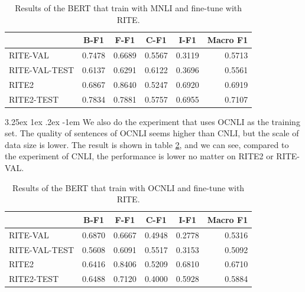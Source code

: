 \documentclass[12pt]{article}
\makeatletter
\renewcommand\paragraph{\@startsection{paragraph}{5}{\z@}%
  {3.25ex \@plus1ex \@minus.2ex}%
  {-1em}%
  {\normalfont\normalsize\bfseries}}
\makeatother
\begin{document}
\begin{CJK*}{UTF8}{bkai}
\begin{spacing}{1.77}
\begin{table}[H]
  \centering
  \setlength{\extrarowheight}{-3pt}
  \begin{tabular}{|l|r|r|r|r|r|}
  \hline
   & \multicolumn{1}{c|}{B-F1} & \multicolumn{1}{c|}{F-F1} & \multicolumn{1}{c|}{C-F1} & \multicolumn{1}{c|}{I-F1} & \multicolumn{1}{c|}{Macro F1} \\ \hline
  RITE-VAL & 0.7478 & 0.6689 & 0.5567 & 0.3119 & 0.5713 \\ \hline
  RITE-VAL-TEST & 0.6137 & 0.6291 & 0.6122 & 0.3696 & 0.5561 \\ \hline
  RITE2 & 0.6867 & 0.8640 & 0.5247 & 0.6920 & 0.6919 \\ \hline
  RITE2-TEST & 0.7834 & 0.7881 & 0.5757 & 0.6955 & 0.7107 \\ \hline
  \end{tabular}
  \caption{Results of the BERT that train with MNLI and fine-tune with RITE.}
  \label{result:bert_mnli_transfer}
\end{table}

\paragraph{}
We also do the experiment that uses OCNLI as the training set. The quality of sentences of OCNLI seems higher than CNLI, but the scale of data size is lower. The result is shown in table \ref{result:bert_ocnli_transfer}, and we can see, compared to the experiment of CNLI, the performance is lower no matter on RITE2 or RITE-VAL.

\begin{table}[H]
  \centering
  \setlength{\extrarowheight}{-3pt}
  \begin{tabular}{|l|r|r|r|r|r|}
  \hline
   & \multicolumn{1}{c|}{B-F1} & \multicolumn{1}{c|}{F-F1} & \multicolumn{1}{c|}{C-F1} & \multicolumn{1}{c|}{I-F1} & \multicolumn{1}{c|}{Macro F1} \\ \hline
  RITE-VAL & 0.6870 & 0.6667 & 0.4948 & 0.2778 & 0.5316 \\ \hline
  RITE-VAL-TEST & 0.5608 & 0.6091 & 0.5517 & 0.3153 & 0.5092 \\ \hline
  RITE2 & 0.6416 & 0.8406 & 0.5209 & 0.6810 & 0.6710 \\ \hline
  RITE2-TEST & 0.6488 & 0.7120 & 0.4000 & 0.5928 & 0.5884 \\ \hline
  \end{tabular}
  \caption{Results of the BERT that train with OCNLI and fine-tune with RITE.}
  \label{result:bert_ocnli_transfer}
\end{table}


\end{spacing}
\end{CJK*}
\end{document}

